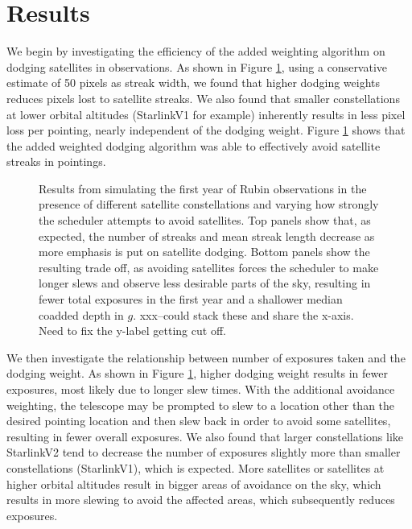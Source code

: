 \documentclass[linenumbers]{aastex631}
\begin{document}
\section{Results}
We begin by investigating the efficiency of the added weighting algorithm on dodging
satellites in observations. As shown in Figure \ref{fig-pixel-loss-weight}, using a conservative estimate of 50 pixels as
streak width, we found that higher dodging weights reduces pixels lost to satellite streaks. We
also found that smaller constellations at lower orbital altitudes (StarlinkV1 for example)
inherently results in less pixel loss per pointing, nearly independent of the dodging weight.
Figure \ref{fig-pixel-loss-weight} shows that the added weighted dodging algorithm was able to effectively avoid satellite streaks in pointings.

\begin{figure}[ht!]
\caption{Results from simulating the first year of Rubin observations in the presence of different satellite constellations and varying how strongly the scheduler attempts to avoid satellites.  Top panels show that, as expected, the number of streaks and mean streak length decrease as more emphasis is put on satellite dodging. Bottom panels show the resulting trade off, as avoiding satellites forces the scheduler to make longer slews and observe less desirable parts of the sky, resulting in fewer total exposures in the first year and a shallower median coadded depth in $g$.
xxx--could stack these and share the x-axis. Need to fix the y-label getting cut off.
\label{fig-pixel-loss-weight}}
\end{figure}

We then investigate the relationship between number of exposures taken and the dodging
weight. As shown in Figure \ref{fig-pixel-loss-weight}, higher dodging weight results in fewer exposures, most likely due
to longer slew times. With the additional avoidance weighting, the telescope may be prompted to
slew to a location other than the desired pointing location and then slew back in order to avoid
some satellites, resulting in fewer overall exposures. We also found that larger constellations like
StarlinkV2 tend to decrease the number of exposures slightly more than smaller constellations
(StarlinkV1), which is expected. More satellites or satellites at higher orbital altitudes result in
bigger areas of avoidance on the sky, which results in more slewing to avoid the affected areas,
which subsequently reduces exposures. \\
\end{document}
